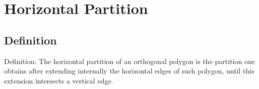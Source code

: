 \documentclass{beamer}
\begin{document}
\section{Horizontal Partition}
\subsection{Definition}
\begin{frame}
\begin{block}{Definition:}
	The horizontal partition of an orthogonal polygon is the partition one obtains after extending internally the horizontal edges of such polygon, until this extension intersects a vertical edge.
\end{block}
\end{frame}
\end{document}
